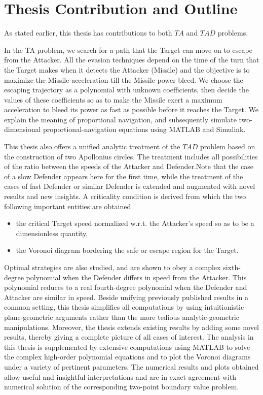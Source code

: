 \section{Thesis Contribution and Outline}
As stated earlier, this thesis has contributions to both $ TA $ and $ TAD $ problems.

In the TA problem, we search for a path that the Target can move on to escape from the Attacker. All the evasion techniques depend on the time of the turn that the Target makes when it detects the Attacker (Missile) and the objective is to maximize the Missile acceleration till the Missile power bleed. We choose the escaping trajectory as a polynomial with unknown coefficients, then decide the values of these coefficients so as to make the Missile exert a maximum acceleration to bleed its power as fast as possible before it reaches the Target. We explain the meaning of proportional navigation, and subsequently simulate two- dimensional proportional-navigation equations using MATLAB and Simulink.

This thesis also offers a unified analytic treatment of the $TAD$ problem based on the construction of two Apollonius circles.
The treatment includes all possibilities of the ratio between the speeds of the Attacker and Defender.Note that the case of a slow Defender appears here for the first time, while the treatment of the cases of fast Defender or similar Defender is extended and augmented with novel results and new insights. A criticality condition is derived from which the two following important entities are obtained
\begin{itemize}
\item the critical Target speed normalized w.r.t. the Attacker's speed so as to be a dimensionless quantity,
\item the Voronoi diagram bordering the safe or escape region for the Target.
\end{itemize}

Optimal strategies are also studied, and are shown to obey a complex sixth-degree polynomial when the Defender differs in speed from the Attacker. This polynomial reduces to a real fourth-degree polynomial when the Defender and Attacker are similar in speed.
Beside unifying previously published results in a common setting, this thesis simplifies all computations by using intuitionistic plane-geometric arguments rather than the more tedious analytic-geometric manipulations. 
Moreover, the thesis extends existing results by adding some novel results, thereby giving a complete picture of all cases of interest.
The analysis in this thesis is supplemented by extensive computations using MATLAB to solve the complex high-order polynomial equations and to plot the Voronoi diagrams under a variety of pertinent parameters. The numerical results and plots obtained allow useful and insightful interpretations and are in exact agreement with numerical solution of the corresponding two-point boundary value problem.

